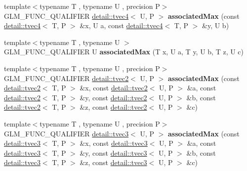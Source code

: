 \begin{DoxyCompactItemize}
\item 
{\footnotesize template$<$typename T , typename U , precision P$>$ }\\G\+L\+M\+\_\+\+F\+U\+N\+C\+\_\+\+Q\+U\+A\+L\+I\+F\+I\+ER \hyperlink{structglm_1_1detail_1_1tvec4}{detail\+::tvec4}$<$ U, P $>$ {\bfseries associated\+Max} (const \hyperlink{structglm_1_1detail_1_1tvec4}{detail\+::tvec4}$<$ T, P $>$ \&x, U a, const \hyperlink{structglm_1_1detail_1_1tvec4}{detail\+::tvec4}$<$ T, P $>$ \&y, U b)\hypertarget{namespaceglm_afe37630c8b8738b686795f3540e18433}{}\label{namespaceglm_afe37630c8b8738b686795f3540e18433}

\item 
{\footnotesize template$<$typename T , typename U $>$ }\\G\+L\+M\+\_\+\+F\+U\+N\+C\+\_\+\+Q\+U\+A\+L\+I\+F\+I\+ER U {\bfseries associated\+Max} (T x, U a, T y, U b, T z, U c)\hypertarget{namespaceglm_a05414bdce7cb412a7417e04afe225095}{}\label{namespaceglm_a05414bdce7cb412a7417e04afe225095}

\item 
{\footnotesize template$<$typename T , typename U , precision P$>$ }\\G\+L\+M\+\_\+\+F\+U\+N\+C\+\_\+\+Q\+U\+A\+L\+I\+F\+I\+ER \hyperlink{structglm_1_1detail_1_1tvec2}{detail\+::tvec2}$<$ U, P $>$ {\bfseries associated\+Max} (const \hyperlink{structglm_1_1detail_1_1tvec2}{detail\+::tvec2}$<$ T, P $>$ \&x, const \hyperlink{structglm_1_1detail_1_1tvec2}{detail\+::tvec2}$<$ U, P $>$ \&a, const \hyperlink{structglm_1_1detail_1_1tvec2}{detail\+::tvec2}$<$ T, P $>$ \&y, const \hyperlink{structglm_1_1detail_1_1tvec2}{detail\+::tvec2}$<$ U, P $>$ \&b, const \hyperlink{structglm_1_1detail_1_1tvec2}{detail\+::tvec2}$<$ T, P $>$ \&z, const \hyperlink{structglm_1_1detail_1_1tvec2}{detail\+::tvec2}$<$ U, P $>$ \&c)\hypertarget{namespaceglm_a69390fa2f28e98f8a9f8186d8197dc27}{}\label{namespaceglm_a69390fa2f28e98f8a9f8186d8197dc27}

\item 
{\footnotesize template$<$typename T , typename U , precision P$>$ }\\G\+L\+M\+\_\+\+F\+U\+N\+C\+\_\+\+Q\+U\+A\+L\+I\+F\+I\+ER \hyperlink{structglm_1_1detail_1_1tvec3}{detail\+::tvec3}$<$ U, P $>$ {\bfseries associated\+Max} (const \hyperlink{structglm_1_1detail_1_1tvec3}{detail\+::tvec3}$<$ T, P $>$ \&x, const \hyperlink{structglm_1_1detail_1_1tvec3}{detail\+::tvec3}$<$ U, P $>$ \&a, const \hyperlink{structglm_1_1detail_1_1tvec3}{detail\+::tvec3}$<$ T, P $>$ \&y, const \hyperlink{structglm_1_1detail_1_1tvec3}{detail\+::tvec3}$<$ U, P $>$ \&b, const \hyperlink{structglm_1_1detail_1_1tvec3}{detail\+::tvec3}$<$ T, P $>$ \&z, const \hyperlink{structglm_1_1detail_1_1tvec3}{detail\+::tvec3}$<$ U, P $>$ \&c)\hypertarget{namespaceglm_af82b37be75e0c5604427cd0f2520cd5a}{}\label{namespaceglm_af82b37be75e0c5604427cd0f2520cd5a}


\end{DoxyCompactItemize}
